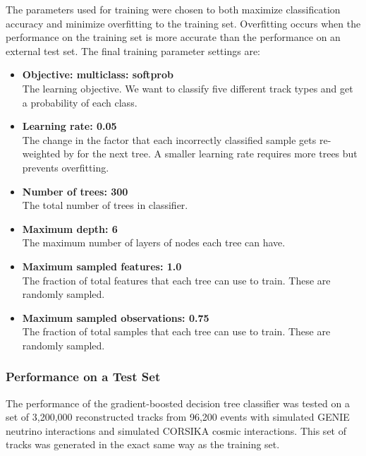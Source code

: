     The parameters used for training were chosen to both maximize
    classification accuracy and minimize overfitting to the training set.
    Overfitting occurs when the performance on the training set is more
    accurate than the performance on an external test set. The final training
    parameter settings are:
    \begin{itemize}
      \item \textbf{Objective: multiclass: softprob} \\
      The learning objective. We want to classify five different track types
      and get a probability of each class.  
      \item \textbf{Learning rate: 0.05}  \\
      The change in the factor that each incorrectly classified sample gets
      re-weighted by for the next tree.  A smaller learning rate requires more
      trees but prevents overfitting.
      \item \textbf{Number of trees: 300} \\
      The total number of trees in classifier.
      \item \textbf{Maximum depth: 6} \\ 
      The maximum number of layers of nodes each tree can have.
      \item \textbf{Maximum sampled features: 1.0} \\
      The fraction of total features that each tree can use to train. These are
      randomly sampled.
      \item \textbf{Maximum sampled observations: 0.75} \\
      The fraction of total samples that each tree can use to train. These are
      randomly sampled.
    \end{itemize}

  \subsubsection{Performance on a Test Set}\label{sec:protonidtest}
    The performance of the gradient-boosted decision tree classifier was tested
    on a set of 3,200,000 reconstructed tracks from 96,200 events with
    simulated GENIE neutrino interactions and simulated CORSIKA cosmic
    interactions. This set of tracks was generated in the exact same way as the
    training set.

